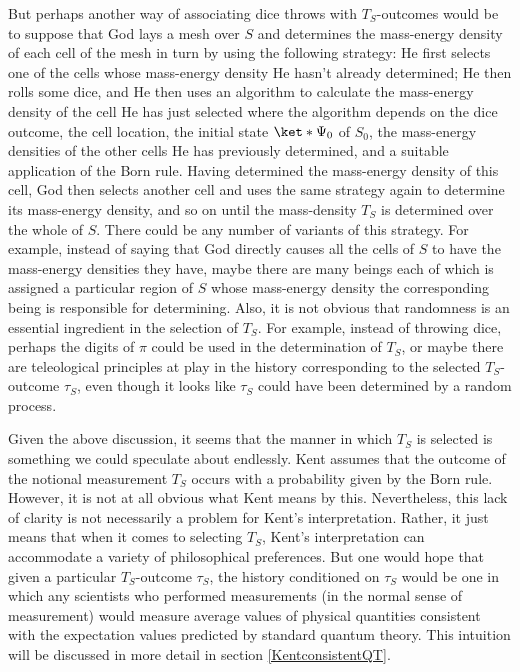 \documentclass[12pt]{report}
\begin{document}
But perhaps another way of associating dice throws with $T_S$-outcomes would be to suppose that God lays a mesh over $S$ and determines the mass-energy density of each cell of the mesh in turn by using the following strategy: He first selects one of the cells whose mass-energy density He hasn't already determined; He then rolls some dice, and He then uses an algorithm to calculate the mass-energy density of the cell He has just selected where the algorithm depends on the dice outcome, the cell location, the initial state $\ket*{\Psi_0}$ of $S_0$, the mass-energy densities of the other cells He has previously determined, and a suitable application of the Born rule. Having determined the mass-energy density of this cell, God then selects another cell and uses the same strategy again to determine its mass-energy density, and so on until the mass-density $T_S$ is determined over the whole of $S$. There could be any number of variants of this strategy. For example, instead of saying that God directly causes all the cells of $S$ to have the mass-energy densities they have, maybe there are many beings each of which is assigned a particular region of $S$ whose mass-energy density the corresponding being is responsible for determining. Also, it is not obvious that randomness is an essential ingredient in the selection of $T_S$. For example, instead of throwing dice, perhaps the digits of $\pi$ could be used in the determination of $T_S$, or maybe there are teleological principles at play in the history corresponding to the selected $T_S$-outcome $\tau_S$, even though it looks like $\tau_S$ could have been determined by a random process. 

Given the above discussion, it seems that the manner in which $T_S$ is selected is something we could speculate about endlessly. Kent assumes that the outcome of the notional measurement $T_S$ occurs with a probability given by the Born rule. However, it is not at all obvious what Kent means by this. Nevertheless, this lack of clarity is not necessarily a problem for Kent's interpretation. Rather, it just means that when it comes to selecting $T_S$, Kent's interpretation can accommodate a variety of philosophical preferences. But one would hope that given a particular $T_S$-outcome $\tau_S$, the history conditioned on $\tau_S$ would be one in which any scientists who performed measurements (in the normal sense of measurement) would measure average values of physical quantities consistent with the expectation values predicted by standard quantum theory. This intuition will be discussed in more detail in section \ref{KentconsistentQT}.\label{selectionmeaningend}
\end{document}
